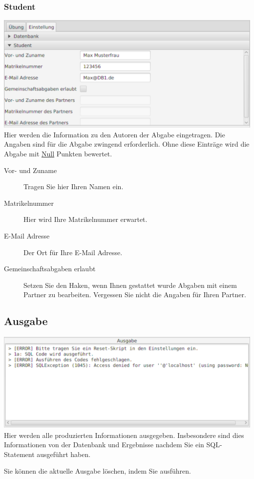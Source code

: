 \documentclass[11pt]{article}
\begin{document}
\subsubsection{Student}
\label{subsubsec:Student}
\includegraphics[width=1.0\textwidth]{figures/student}
Hier werden die Information zu den Autoren der Abgabe eingetragen. Die Angaben sind für die Abgabe zwingend erforderlich. Ohne diese Einträge wird die Abgabe mit \underline{Null} Punkten bewertet.

\begin{description}
	\item[Vor- und Zuname] Tragen Sie hier Ihren Namen ein.
	\item[Matrikelnummer] Hier wird Ihre Matrikelnummer erwartet.
	\item[E-Mail Adresse] Der Ort für Ihre E-Mail Adresse.
	\item[Gemeinschaftsabgaben erlaubt] Setzen Sie den Haken, wenn Ihnen gestattet wurde Abgaben mit einem Partner zu bearbeiten. Vergessen Sie nicht die Angaben für Ihren Partner.
\end{description}

\subsection{Ausgabe}
\label{subsec:Ausgabe}
\includegraphics[width=1.0\textwidth]{figures/out}
Hier werden alle produzierten Informationen ausgegeben. Insbesondere sind dies Informationen von der Datenbank und Ergebnisse nachdem Sie ein SQL-Statement ausgeführt haben.

Sie können die aktuelle Ausgabe löschen, indem Sie  ausführen.
\end{document}
